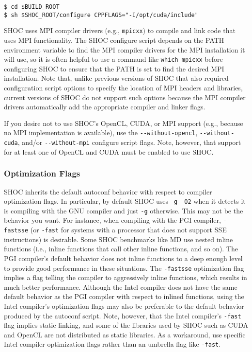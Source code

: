 \documentclass[11pt]{article}
\begin{document}
\begin{Verbatim}[frame=single]
$ cd $BUILD_ROOT
$ sh $SHOC_ROOT/configure CPPFLAGS="-I/opt/cuda/include"
\end{Verbatim}

SHOC uses MPI compiler drivers (e.g., \verb+mpicxx+) to compile and link code
that uses MPI functionality.
The SHOC configure script depends on the PATH environment variable to find
the MPI compiler drivers for the MPI installation it will use, so it is often
helpful to use a command like \verb+which mpicxx+ before configuring SHOC
to ensure that the PATH is set to find the desired MPI installation.
Note that, unlike previous versions of SHOC that also required configuration
script options to specify the location of MPI headers and libraries, current
versions of SHOC do not support such options because the MPI compiler drivers
automatically add the appropriate compiler and linker flags.

If you desire not to use SHOC's OpenCL, CUDA, or MPI support (e.g., because
no MPI implementation is available), use the \verb+--without-opencl+,
\verb+--without-cuda+,
and/or \verb+--without-mpi+ configure script flags.
Note, however, that support for at least one of OpenCL and CUDA must be
enabled to use SHOC.

\subsubsection{Optimization Flags}\label{sec:confoptflags}

SHOC inherits the default autoconf behavior with respect to compiler 
optimization flags.
In particular, by default SHOC uses \verb+-g -O2+ when it detects it is
compiling with the GNU compiler and just \verb+-g+ otherwise.
This may not be the behavior you want.
For instance, when compiling with the PGI compiler, \verb+-fastsse+ 
(or \verb+-fast+ for systems with a processor that does not support SSE
instructions) is desirable.
Some SHOC benchmarks like MD use nested inline functions (i.e., inline
functions that call other inline functions, and so on).
The PGI compiler's default behavior does not inline functions to a deep enough
level to provide good performance in these situations.
The \verb+-fastsse+ optimization flag implies a flag telling the compiler
to aggressively inline functions, which results in much better performance.
Although the Intel compiler does not have the same default behavior as
the PGI compiler with respect to inlined functions, using the Intel
compiler's optimization flags may also be preferable to the default behavior
produced by the autoconf script.
Note, however, that the Intel compiler's \verb+-fast+ flag implies static
linking, and some of the libraries used by SHOC such as CUDA and OpenCL 
are not distributed as static libraries.
As a workaround, use specific Intel compiler optimization flags rather than
an umbrella flag like \verb+-fast+.
\end{document}
